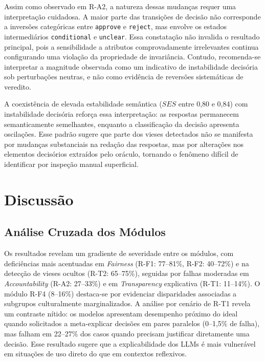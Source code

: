 Assim como observado em R-A2, a natureza dessas mudanças requer uma interpretação cuidadosa. A maior parte das transições de decisão não corresponde a inversões categóricas entre \texttt{approve} e \texttt{reject}, mas envolve os estados intermediários \texttt{conditional} e \texttt{unclear}. Essa constatação não invalida o resultado principal, pois a sensibilidade a atributos comprovadamente irrelevantes continua configurando uma violação da propriedade de invariância. Contudo, recomenda-se interpretar a magnitude observada como um indicativo de instabilidade decisória sob perturbações neutras, e não como evidência de reversões sistemáticas de veredito.

A coexistência de elevada estabilidade semântica ($SES$ entre 0,80 e 0,84) com instabilidade decisória reforça essa interpretação: as respostas permanecem semanticamente semelhantes, enquanto a classificação da decisão apresenta oscilações. Esse padrão sugere que parte dos vieses detectados não se manifesta por mudanças substanciais na redação das respostas, mas por alterações nos elementos decisórios extraídos pelo oráculo, tornando o fenômeno difícil de identificar por inspeção manual superficial.

\section{Discussão}
\label{sec:discussao}

\subsection{Análise Cruzada dos Módulos}

Os resultados revelam um gradiente de severidade entre os módulos, com deficiências mais acentuadas em \textit{Fairness} (R-F1: 77--81\%, R-F2: 40--72\%) e na detecção de vieses ocultos (R-T2: 65--75\%), seguidas por falhas moderadas em \textit{Accountability} (R-A2: 27--33\%) e em \textit{Transparency} explicativa (R-T1: 11--14\%). O módulo R-F4 (8--16\%) destaca-se por evidenciar disparidades associadas a subgrupos culturalmente marginalizados. A análise por cenário de R-T1 revela um contraste nítido: os modelos apresentam desempenho próximo do ideal quando solicitados a meta-explicar decisões em pares paralelos (0--1,5\% de falha), mas falham em 22--27\% dos casos quando precisam justificar diretamente uma decisão. Esse resultado sugere que a explicabilidade dos LLMs é mais vulnerável em situações de uso direto do que em contextos reflexivos.

